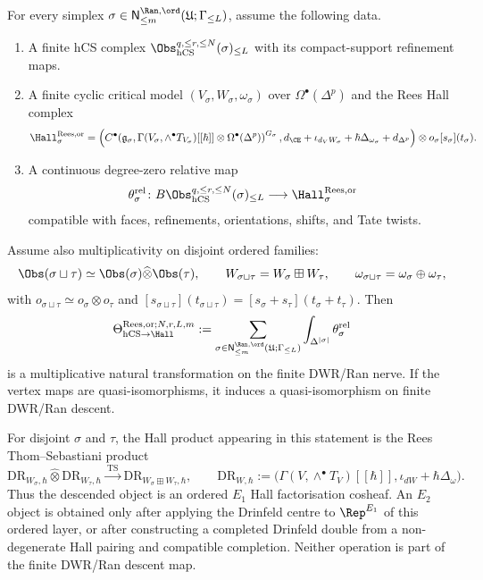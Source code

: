 \begin{proposition}
\label{prop:finite-dwr-ran-rees-ordered-hall-layer}
For every simplex $\sigma\in
\mathsf N^{\Ran,\ord}_{\le m}(\mathfrak U;\Gamma_{\le L})$, assume
the following data.
\begin{enumerate}
\item A finite hCS complex
$\Obs_{\mathrm{hCS}}^{q,\le r,\le N}(\sigma)_{\le L}$ with its
compact-support refinement maps.
\item A finite cyclic critical model
$(V_\sigma,W_\sigma,\omega_\sigma)$ over
$\Omega^\bullet(\Delta^p)$ and the Rees Hall complex
\[
 \Hall_{\sigma}^{\mathrm{Rees},\mathrm{or}}
 =
 \left(
 C^\bullet\!\left(
 \mathfrak g_\sigma,
 \Gamma(V_\sigma,\wedge^\bullet T_{V_\sigma})[[\hbar]]
 \otimes\Omega^\bullet(\Delta^p)
 \right)^{G_\sigma},
 d_{\CE}+\iota_{d_VW_\sigma}
 +\hbar\Delta_{\omega_\sigma}+d_{\Delta^p}
 \right)
 \otimes o_\sigma[s_\sigma](t_\sigma).
\]
\item A continuous degree-zero relative map
\[
 \theta_\sigma^{\mathrm{rel}}\colon
 B\Obs_{\mathrm{hCS}}^{q,\le r,\le N}(\sigma)_{\le L}
 \longrightarrow
 \Hall_{\sigma}^{\mathrm{Rees},\mathrm{or}}
\]
compatible with faces, refinements, orientations, shifts, and Tate
twists.
\end{enumerate}
Assume also multiplicativity on disjoint ordered families:
\[
 \Obs(\sigma\sqcup\tau)\simeq
 \Obs(\sigma)\widehat\otimes\Obs(\tau),\qquad
 W_{\sigma\sqcup\tau}=W_\sigma\boxplus W_\tau,\qquad
 \omega_{\sigma\sqcup\tau}=\omega_\sigma\oplus\omega_\tau,
\]
with $o_{\sigma\sqcup\tau}\simeq o_\sigma\otimes o_\tau$ and
$[s_{\sigma\sqcup\tau}](t_{\sigma\sqcup\tau})=
[s_\sigma+s_\tau](t_\sigma+t_\tau)$. Then
\[
 \Theta_{\mathrm{hCS}\to\Hall}^{\mathrm{Rees},\mathrm{or};N,r,L,m}
 :=
 \sum_{\sigma\in\mathsf N^{\Ran,\ord}_{\le m}(\mathfrak U;\Gamma_{\le L})}
 \int_{\Delta^{|\sigma|}}\theta_\sigma^{\mathrm{rel}}
\]
is a multiplicative natural transformation on the finite DWR/Ran nerve.
If the vertex maps are quasi-isomorphisms, it induces a
quasi-isomorphism on finite DWR/Ran descent.

For disjoint $\sigma$ and $\tau$, the Hall product appearing in this
statement is the Rees Thom--Sebastiani product
\[
 \mathrm{DR}_{W_\sigma,\hbar}\widehat\otimes
 \mathrm{DR}_{W_\tau,\hbar}
 \xrightarrow{\ \mathrm{TS}\ }
 \mathrm{DR}_{W_\sigma\boxplus W_\tau,\hbar},
 \qquad
 \mathrm{DR}_{W,\hbar}:=
 \bigl(\Gamma(V,\wedge^\bullet T_V)[[\hbar]],
 \iota_{dW}+\hbar\Delta_\omega).
\]
Thus the descended object is an ordered $E_1$ Hall factorisation
cosheaf. An $E_2$ object is obtained only after applying the Drinfeld
centre to $\Rep^{E_1}$ of this ordered layer, or after constructing a
completed Drinfeld double from a non-degenerate Hall pairing and
compatible completion. Neither operation is part of the finite
DWR/Ran descent map.
\end{proposition}

